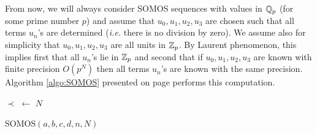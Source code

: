 \documentclass{lms}
\begin{document}
From now, we will always consider SOMOS sequences with values in $\mathbb Q_p$ 
(for some prime number $p$) and assume that $u_0, u_1, u_2, u_3$ are 
chosen such that all terms $u_n$'s are determined (\emph{i.e.} there is 
no division by zero). We assume also for simplicity that $u_0, u_1, u_2, 
u_3$ are all units in $\mathbb Z_p$. By Laurent phenomenon, this implies first 
that all $u_n$'s lie in $\mathbb Z_p$ and second that if $u_0, u_1, u_2, u_3$ 
are known with finite precision $O(p^N)$ then all terms $u_n$'s are 
known with the same precision. Algorithm \ref{algo:SOMOS} presented on 
page \pageref{algo:SOMOS} performs this computation.

\begin{algorithm}[t]
\BlankLine
$\prec$ $\leftarrow$ $N$\;
\;
\caption{\sc SOMOS$(a, b, c, d, n, N)$}\label{algo:SOMOS}
\end{algorithm}
\end{document}
